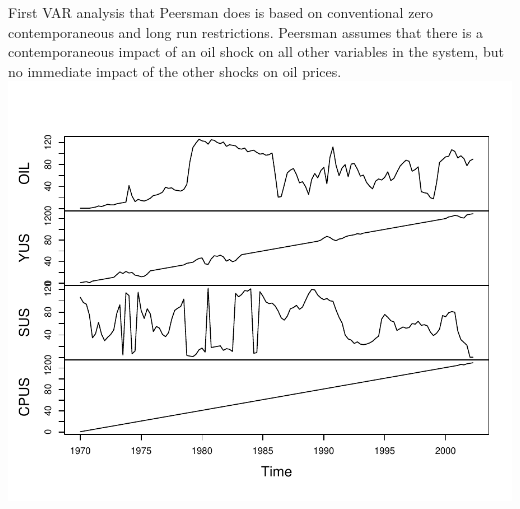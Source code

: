 \documentclass[11pt,preprint, authoryear]{elsarticle}
\numberwithin{equation}{section}
\numberwithin{figure}{section}
\numberwithin{table}{section}
\begin{document}
First VAR analysis that Peersman does is based on conventional zero
contemporaneous and long run restrictions. Peersman assumes that there
is a contemporaneous impact of an oil shock on all other variables in
the system, but no immediate impact of the other shocks on oil prices.
\includegraphics{replication_files/figure-latex/unnamed-chunk-8-1.pdf}
\end{document}
